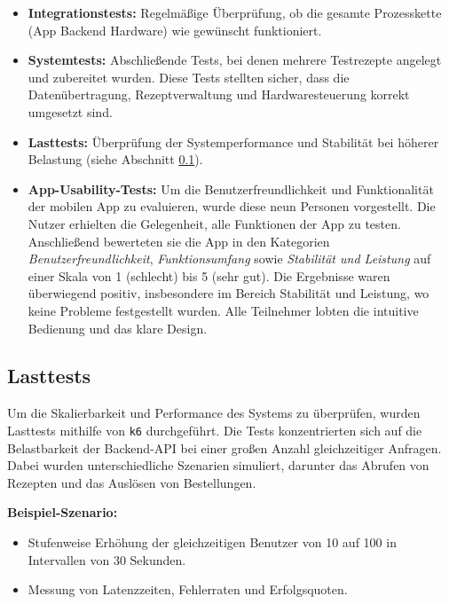 \begin{itemize}
  \item \textbf{Integrationstests:} Regelmäßige Überprüfung, ob die gesamte Prozesskette (App \textrightarrow{} Backend \textrightarrow{} Hardware) wie gewünscht funktioniert.
  \item \textbf{Systemtests:} Abschließende Tests, bei denen mehrere Testrezepte angelegt und zubereitet wurden. Diese Tests stellten sicher, dass die Datenübertragung, Rezeptverwaltung und Hardwaresteuerung korrekt umgesetzt sind.
  \item \textbf{Lasttests:} Überprüfung der Systemperformance und Stabilität bei höherer Belastung (siehe Abschnitt \ref{subsec:lasttests}).
  \item \textbf{App-Usability-Tests:} Um die Benutzerfreundlichkeit und Funktionalität der mobilen App zu evaluieren, wurde diese neun Personen vorgestellt. Die Nutzer erhielten die Gelegenheit, alle Funktionen der App zu testen. Anschließend bewerteten sie die App in den Kategorien \textit{Benutzerfreundlichkeit}, \textit{Funktionsumfang} sowie \textit{Stabilität und Leistung} auf einer Skala von 1 (schlecht) bis 5 (sehr gut). Die Ergebnisse waren überwiegend positiv, insbesondere im Bereich Stabilität und Leistung, wo keine Probleme festgestellt wurden. Alle Teilnehmer lobten die intuitive Bedienung und das klare Design.
\end{itemize}

\subsection{Lasttests}
\label{subsec:lasttests}

Um die Skalierbarkeit und Performance des Systems zu überprüfen, wurden Lasttests mithilfe von \texttt{k6} durchgeführt. Die Tests konzentrierten sich auf die Belastbarkeit der Backend-API bei einer großen Anzahl gleichzeitiger Anfragen. Dabei wurden unterschiedliche Szenarien simuliert, darunter das Abrufen von Rezepten und das Auslösen von Bestellungen.\newline

\textbf{Beispiel-Szenario:}
\begin{itemize}
  \item Stufenweise Erhöhung der gleichzeitigen Benutzer von 10 auf 100 in Intervallen von 30 Sekunden.
  \item Messung von Latenzzeiten, Fehlerraten und Erfolgsquoten.
\end{itemize}

